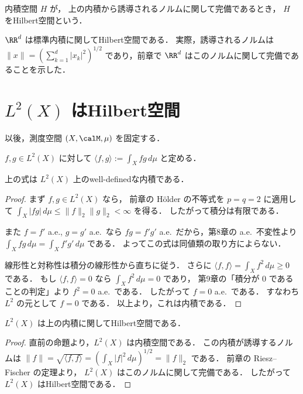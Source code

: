 \begin{definition}[Hilbert空間]
内積空間 $H$ が，
上の内積から誘導されるノルムに関して完備であるとき，
$H$ をHilbert空間という．
\end{definition}

\begin{example}
$\RR^d$ は標準内積に関してHilbert空間である．
実際，誘導されるノルムは
$\|x\|=\left(\sum_{k=1}^d |x_k|^2\right)^{1/2}$ であり，前章で $\RR^d$ はこのノルムに関して完備であることを示した．
\end{example}

\section{\texorpdfstring{$L^2(X)$}{L2(X)} はHilbert空間}

以後，測度空間 $(X,\calM,\mu)$ を固定する．

\begin{definition}
$f,g\in L^2(X)$ に対して $\langle f,g\rangle:=\int_X f g\,d\mu$ と定める．
\end{definition}

\begin{proposition}
上の式は $L^2(X)$ 上のwell-definedな内積である．
\end{proposition}
\begin{proof}
まず $f,g\in L^2(X)$ なら，
前章の Hölder の不等式を $p=q=2$ に適用して
$\int_X |fg|\,d\mu\le \|f\|_2\|g\|_2<\infty$ を得る．
したがって積分は有限である．

また $f=f'$ a.e., $g=g'$ a.e.\ なら
$fg=f'g'$ a.e.\ だから，第8章の a.e.\ 不変性より
$\int_X fg\,d\mu=\int_X f'g'\,d\mu$ である．
よってこの式は同値類の取り方によらない．

線形性と対称性は積分の線形性から直ちに従う．
さらに $\langle f,f\rangle=\int_X f^2\,d\mu\ge 0$ である．
もし $\langle f,f\rangle=0$ なら $\int_X f^2\,d\mu=0$ であり，
第9章の「積分が $0$ であることの判定」より $f^2=0$ a.e.\ である．
したがって $f=0$ a.e.\ である．
すなわち $L^2$ の元として $f=0$ である．
以上より，これは内積である．
\end{proof}

\begin{theorem}
$L^2(X)$ は上の内積に関してHilbert空間である．
\end{theorem}
\begin{proof}
直前の命題より，$L^2(X)$ は内積空間である．
この内積が誘導するノルムは
$\|f\|=\sqrt{\langle f,f\rangle}=\left(\int_X |f|^2\,d\mu\right)^{1/2}=\|f\|_2$ である．
前章の Riesz--Fischer の定理より，
$L^2(X)$ はこのノルムに関して完備である．
したがって $L^2(X)$ はHilbert空間である．
\end{proof}

